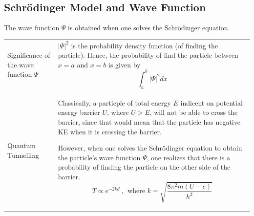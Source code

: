 \documentclass[a4paper,11pt]{article}
\begin{document}
		\subsection{Schr\"{o}dinger Model and Wave Function}
			The wave function $\Psi$ is obtained when one solves the Schr\"{o}dinger equation.
			\begin{center}
				\renewcommand{\arraystretch}{1.6}
				\begin{tabular}{@{} p{3.4cm} p{10.9cm} @{}}
					\toprule
					Significance of the wave function $\Psi$ & $|\Psi|^2$ is the probability density function (of finding the particle). Hence, the probability of find the particle between $x=a$ and $x=b$ is given by $$\int_{a}^{b}|\Psi|^2 dx$$\vspace*{-\baselineskip}\\
					Quantum Tunnelling & Classically, a particple of total energy $E$ indicent on potential energy barrier $U$, where $U>E$, will not be able to cross the barrier, since that would mean that the particle has negative KE when it is crossing the barrier. \par However, when one solves the Schr\"{o}dinger equation to obtain the particle's wave function $\Psi$, one realizes that there is a probability of finding the particle on the other side of the barrier.$$T \propto e^{-2kd}~,~~\textrm{where } k=\sqrt{\frac{8\pi^2m(U-e)}{h^2}}$$ \vspace*{-\baselineskip}\\
					\bottomrule
				\end{tabular}
			\end{center}
\end{document}
